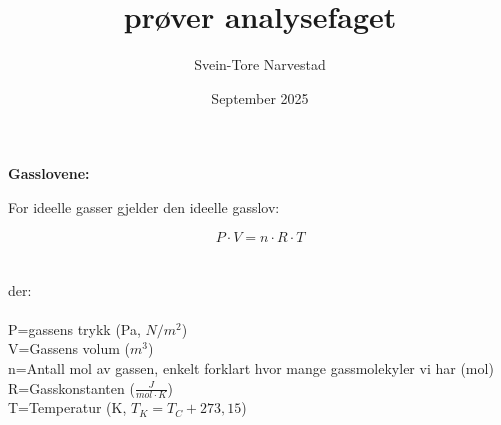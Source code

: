 \documentclass[12pt,a4paper]{article}
\title{prøver analysefaget}
\author{Svein-Tore Narvestad}
\date{September 2025}
\begin{document}
\begin{center}
\textbf{Gasslovene:}\\
\end{center}
For ideelle gasser gjelder den ideelle  gasslov:\vspace{1cm}

$$P\cdot V=n\cdot R \cdot T$$ \\\\
der:\\\\
P=gassens trykk (Pa, $N/m^2$)\\
V=Gassens volum ($m^3$)\\
n=Antall mol av gassen, enkelt forklart hvor mange gassmolekyler vi har (mol)\\
R=Gasskonstanten ($\frac{J}{mol\cdot K}$)\\
T=Temperatur (K, $T_K=T_C+273,15$)\\
\end{document}
